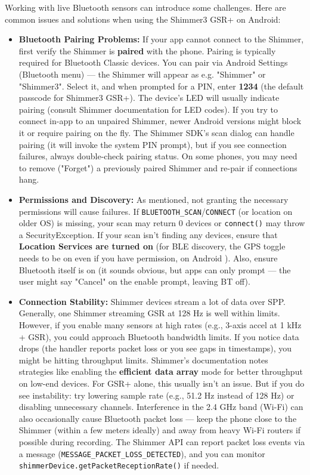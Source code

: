 {{Working with live Bluetooth sensors can introduce some challenges. Here
are common issues and solutions when using the Shimmer3 GSR+ on Android:

\begin{itemize}
\item \textbf{Bluetooth Pairing Problems:} If your app cannot connect to the
  Shimmer, first verify the Shimmer is \textbf{paired} with the phone.
  Pairing is typically required for Bluetooth Classic devices. You can
  pair via Android Settings (Bluetooth menu) --- the Shimmer will appear
  as e.g. "Shimmer" or "Shimmer3". Select it, and when prompted for a
  PIN, enter \textbf{1234} (the default passcode for Shimmer3
  GSR+)\cite{ref20}.
  The device's LED will usually indicate pairing (consult Shimmer
  documentation for LED codes). If you try to connect in-app to an
  unpaired Shimmer, newer Android versions might block it or require
  pairing on the fly. The Shimmer SDK's scan dialog can handle pairing
  (it will invoke the system PIN prompt), but if you see connection
  failures, always double-check pairing status. On some phones, you may
  need to remove ("Forget") a previously paired Shimmer and re-pair if
  connections hang.

\item \textbf{Permissions and Discovery:} As mentioned, not granting the
  necessary permissions will cause failures. If
  \texttt{BLUETOOTH_SCAN}/\texttt{CONNECT} (or location on older OS) is missing, your
  scan may return 0 devices or \texttt{connect()} may throw a
  SecurityException. If your scan isn't finding any devices, ensure that
  \textbf{Location Services are turned on} (for BLE discovery, the GPS toggle
  needs to be on even if you have permission, on Android ). Also,
  ensure Bluetooth itself is on (it sounds obvious, but apps can only
  prompt --- the user might say "Cancel" on the enable prompt, leaving BT
  off).

\item \textbf{Connection Stability:} Shimmer devices stream a lot of data over
  SPP. Generally, one Shimmer streaming GSR at 128 Hz is well within
  limits. However, if you enable many sensors at high rates (e.g.,
  3-axis accel at 1 kHz + GSR), you could approach Bluetooth bandwidth
  limits. If you notice data drops (the handler reports packet loss or
  you see gaps in timestamps), you might be hitting throughput limits.
  Shimmer's documentation notes strategies like enabling the \textbf{efficient
  data array} mode for better throughput on low-end
  devices\cite{ref40}.
  For GSR+ alone, this usually isn't an issue. But if you do see
  instability: try lowering sample rate (e.g., 51.2 Hz instead of 128
  Hz) or disabling unnecessary channels. Interference in the 2.4 GHz
  band (Wi-Fi) can also occasionally cause Bluetooth packet loss --- keep
  the phone close to the Shimmer (within a few meters ideally) and away
  from heavy Wi-Fi routers if possible during recording. The Shimmer API
  can report packet loss events via a message
  (\texttt{MESSAGE_PACKET_LOSS_DETECTED}), and you can monitor
  \texttt{shimmerDevice.getPacketReceptionRate()} if needed.


\end{itemize}}}
